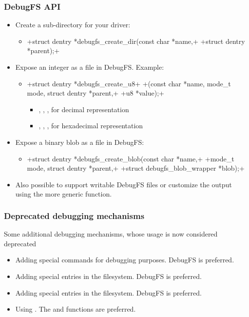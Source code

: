 \begin{frame}[fragile]
  \frametitle{DebugFS API}
  \begin{itemize}
  \item Create a sub-directory for your driver:
    \begin{itemize}
    \item {}+struct dentry *debugfs_create_dir(const char *name,+
      +struct dentry *parent);+
    \end{itemize}
  \item Expose an integer as a file in DebugFS. Example:
    \begin{itemize}
    \item {}+struct dentry *debugfs_create_u8+
      +(const char *name, mode_t mode, struct dentry *parent,+
      +u8 *value);+
      \begin{itemize}
      \item {}, , ,  for decimal representation
      \item {}, , ,  for hexadecimal representation
      \end{itemize}
    \end{itemize}
  \item Expose a binary blob as a file in DebugFS:
    \begin{itemize}
    \item {}+struct dentry *debugfs_create_blob(const char *name,+
      +mode_t mode, struct dentry *parent,+
      +struct debugfs_blob_wrapper *blob);+
    \end{itemize}
  \item Also possible to support writable DebugFS files or customize
    the output using the more generic 
    function.
  \end{itemize}
\end{frame}

\begin{frame}
  \frametitle{Deprecated debugging mechanisms}
  Some additional debugging mechanisms, whose usage is now
  considered deprecated
  \begin{itemize}
  \item Adding special  commands for debugging
    purposes. DebugFS is preferred.
  \item Adding special entries in the  filesystem. DebugFS is
    preferred.
  \item Adding special entries in the  filesystem. DebugFS is
    preferred.
  \item Using . The  and 
    functions are preferred.
  \end{itemize}
\end{frame}

